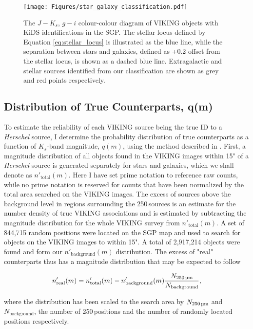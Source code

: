 \begin{figure}
	\texttt{[image: Figures/star\_galaxy\_classification.pdf]}
	\caption{The $J - K_s$, $g-i$ colour-colour diagram of VIKING objects with KiDS identifications in the SGP. The stellar locus defined by Equation \ref{eq:stellar_locus} is illustrated as the blue line, while the separation between stars and galaxies, defined as +0.2 offset from the stellar locus, is shown as a dashed blue line. Extragalactic and stellar sources identified from our classification are shown as grey and red points respectively.}
	\label{fig:star_galaxy_classification}
\end{figure}

\subsection{Distribution of True Counterparts, q(m)}
\label{sec:true_counterparts_distribution}

To estimate the reliability of each VIKING source being the true ID to a \textit{Herschel} source, I determine the probability distribution of true counterparts as a function of $K_s$-band magnitude, $q(m)$, using the method described in \citealt{Ciliegi_2003}. First, a magnitude distribution of all objects found in the VIKING images within 15" of a \textit{Herschel} source is generated separately for stars and galaxies, which we shall denote as $n'_{\textrm{total}}(m)$. Here I have set prime notation to reference raw counts, while no prime notation is reserved for counts that have been normalized by the total area searched on the VIKING images. The excess of sources above the background level in regions surrounding the 250\,\micron sources is an estimate for the number density of true VIKING associations and is estimated by subtracting the magnitude distribution for the whole VIKING survey from $n'_{\textrm{total}}(m)$. A set of 844,715 random positions were located on the SGP map and used to search for objects on the VIKING images to within 15". A total of 2,917,214 objects were found and form our $n'_{\textrm{background}}(m)$ distribution. The excess of "real" counterparts thus has a magnitude distribution that may be expected to follow

\begin{equation}
    n'_{\textrm{real}}(m) = n'_{\textrm{total}}(m) - n'_{\textrm{background}}(m) \frac{N_{\textrm{250\,\micron}}}{N_{\textrm{background}}},
\end{equation}

where the distribution has been scaled to the search area by $N_{\textrm{250\,\micron}}$ and $N_{\textrm{background}}$, the number of 250\,\micron positions and the number of randomly located positions respectively.


